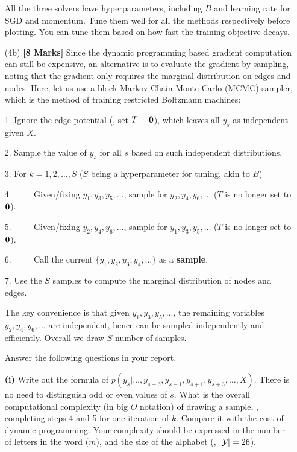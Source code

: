 \documentclass[11pt]{report}
\begin{document}
\begin{itemize}
		All the three solvers have hyperparameters, including $B$ and learning rate for SGD and momentum.
		Tune them well for all the methods respectively before plotting.
		You can tune them based on how fast the training objective decays.
		\item[(4b)] {\bf [8 Marks]} 
		Since the dynamic programming based gradient computation can still be expensive,
		an alternative is to evaluate the gradient by sampling,
		noting that the gradient only requires the marginal distribution on edges and nodes.
		Here, let us use a block Markov Chain Monte Carlo (MCMC) sampler,
		which is the method of training restricted Boltzmann machines:	
		
		1. Ignore the edge potential (\ie, set $T=\mathbf{0}$), which leaves all $y_s$ as independent given $X$.
		
		2. Sample the value of $y_s$ for all $s$ based on such independent distributions.
		
		3. For $k = 1, 2, \ldots, S$ ($S$ being a hyperparameter for tuning, akin to $B$)
		
		4. $\qquad$ Given/fixing $y_1, y_3, y_5, \ldots$, sample for $y_2, y_4, y_6, \ldots$ ($T$ is no longer set to $\mathbf{0}$).
		
		5. $\qquad$ Given/fixing $y_2, y_4, y_6, \ldots$, sample for $y_1, y_3, y_5, \ldots$ ($T$ is no longer set to $\mathbf{0}$).
		
		6. $\qquad$ Call the current $\{y_1, y_2, y_3, y_4, \ldots\}$ as a \textbf{sample}.
		
		7. Use the $S$ samples to compute the marginal distribution of nodes and edges.
		
		The key convenience is that given $y_1, y_3, y_5, \ldots$, 
		the remaining variables $y_2, y_4, y_6, \ldots$ are independent, hence can be sampled independently and efficiently.
		Overall we draw $S$ number of samples.
		
		
		
		
		Answer the following questions in your report.
		
		\textbf{(i)} 
		Write out the formula of $p(y_s|\ldots, y_{s-3}, y_{s-1}, y_{s+1}, y_{s+3}, \ldots, X)$.
		There is no need to distinguish odd or even values of $s$. 
		What is the overall computational complexity (in big $O$ notation) of drawing a sample, \ie, completing steps 4 and 5 for one iteration of $k$.
		Compare it with the cost of dynamic programming.
		Your complexity should be expressed in the number of letters in the word ($m$),
		and the size of the alphabet (\ie, $\left|\mathcal{Y}\right|=26$).
		

\end{itemize}
\end{document}
